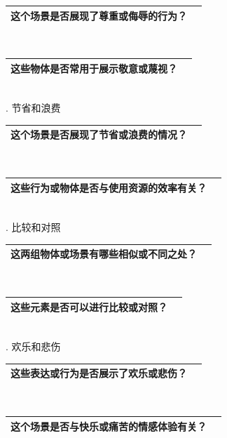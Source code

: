 \documentclass[12pt]{book}
\begin{document}
\begin{tabular}{|p{15cm}|p{3cm}|}
	\hline
这个场景是否展现了尊重或侮辱的行为？\\
	\hline
\end{tabular}\\



\begin{tabular}{|p{15cm}|p{3cm}|}
	\hline
这些物体是否常用于展示敬意或蔑视？\\
	\hline
\end{tabular}\\



. 节省和浪费

\begin{tabular}{|p{15cm}|p{3cm}|}
	\hline
这个场景是否展现了节省或浪费的情况？\\
	\hline
\end{tabular}\\




\begin{tabular}{|p{15cm}|p{3cm}|}
	\hline
这些行为或物体是否与使用资源的效率有关？\\
	\hline
\end{tabular}\\



. 比较和对照

\begin{tabular}{|p{15cm}|p{3cm}|}
	\hline
这两组物体或场景有哪些相似或不同之处？\\
	\hline
\end{tabular}\\



\begin{tabular}{|p{15cm}|p{3cm}|}
	\hline
这些元素是否可以进行比较或对照？\\
	\hline
\end{tabular}\\

. 欢乐和悲伤

\begin{tabular}{|p{15cm}|p{3cm}|}
	\hline
这些表达或行为是否展示了欢乐或悲伤？\\
	\hline
\end{tabular}\\



\begin{tabular}{|p{15cm}|p{3cm}|}
	\hline
这个场景是否与快乐或痛苦的情感体验有关？\\
	\hline
\end{tabular}\\
\end{document}
